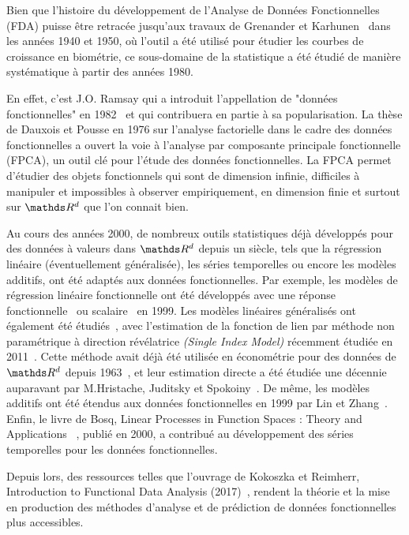 

Bien que l'histoire du développement de l'Analyse de Données Fonctionnelles (FDA) puisse être retracée jusqu'aux travaux de Grenander et Karhunen~\cite{karhunen1946spektraltheorie} dans les années 1940 et 1950, où l'outil a été utilisé pour étudier les courbes de croissance en biométrie, ce sous-domaine de la statistique a été étudié de manière systématique à partir des années 1980.

\bigskip

En effet, c'est J.O. Ramsay qui a introduit l'appellation de "données fonctionnelles" en 1982~\cite{ramsay1982data} et qui contribuera en partie à sa popularisation. La thèse de Dauxois et Pousse en 1976 sur l'analyse factorielle dans le cadre des données fonctionnelles\cite{dauxois1976analyses} a ouvert la voie à l'analyse par composante principale fonctionnelle (FPCA), un outil clé pour l'étude des données fonctionnelles. La FPCA permet d'étudier des objets fonctionnels qui sont de dimension infinie, difficiles à manipuler et impossibles à observer empiriquement, en dimension finie et surtout sur $\R d$ que l'on connait bien.

\bigskip

Au cours des années 2000, de nombreux outils statistiques déjà développés pour des données à valeurs dans $\R d$ depuis un siècle, tels que la régression linéaire (éventuellement généralisée), les séries temporelles ou encore les modèles additifs, ont été adaptés aux données fonctionnelles.
Par exemple, les modèles de régression linéaire fonctionnelle ont été développés avec une réponse fonctionnelle~\cite{ramsay1991some} ou scalaire~\cite{cardot1999functional} en 1999.
Les modèles linéaires généralisés ont également été étudiés~\cite{james2002generalized,muller2005generalized}, avec l'estimation de la fonction de lien par méthode non paramétrique à direction révélatrice \emph{(Single Index Model)} récemment étudiée en 2011~\cite{chen2011single}.
Cette méthode avait déjà été utilisée en économétrie pour des données de $\R d$ depuis 1963~\cite{sharpe1963simplified}, et leur estimation directe a été étudiée une décennie auparavant par M.Hristache, Juditsky et Spokoiny~\cite{hristache2001direct}. De même, les modèles additifs ont été étendus aux données fonctionnelles en 1999 par Lin et Zhang~\cite{lin1999inference}.
Enfin, le livre de Bosq, \textcolor{flatuicolors_blue_devil}{Linear Processes in Function Spaces : Theory and Applications} ~\cite{bosq2000linear}, publié en 2000, a contribué au développement des séries temporelles pour les données fonctionnelles.

\bigskip

Depuis lors, des ressources telles que l'ouvrage de Kokoszka et Reimherr, \textcolor{flatuicolors_blue_devil}{Introduction to Functional Data Analysis (2017)}~\cite{kokoszka2017introduction}, rendent la théorie et la mise en production des méthodes d'analyse et de prédiction de données fonctionnelles plus accessibles.
